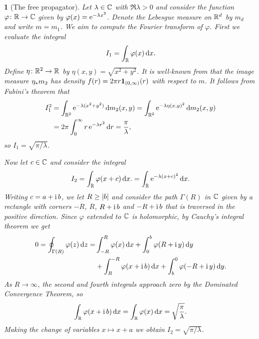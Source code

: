 \documentclass[article, a4paper, 11pt, oneside]{memoir}
\makeatletter
\let\phi\varphi
\numberwithin{equation}{chapter}
\theoremstyle{myexample}
\theoremstyle{myexample}
\theoremstyle{myexamplebreak}
\theoremstyle{myexamplebreak}
\newtheorem{examplebreak}[theorem]{\protect\@example}
\theoremstyle{nonumberplain}
\theoremstyle{MyNonumberplain}
\newcommand{\@example}{}
\renewcommand{\@example}{Example}%
\renewcommand{\@example}{Eksempel}%
\makeatother
\begin{document}
\begin{examplebreak}[The free propagator]
    Let $\lambda \in \mathbb{C}$ with $\Re \lambda > 0$ and consider the function $\phi \colon \setR \to \setC$ given by $\phi(x) = \e^{-\lambda x^2}$. Denote the Lebesgue measure on $\mathbb{R}^d$ by $m_d$ and write $m = m_1$. We aim to compute the Fourier transform of $\phi$. First we evaluate the integral
    \begin{equation*}
        I_1 = \int_\setR \phi(x) \dif x.
    \end{equation*}
    Define $\eta \colon \mathbb{R}^2 \to \mathbb{R}$ by $\eta(x,y) = \sqrt{x^2+y^2}$. It is well-known from \textcite[Opgave~11.4]{thorbjoernsen2014} that the image measure $\eta_* m_2$ has density $f(r) = 2\pi r \mathbf{1}_{(0,\infty)}(r)$ with respect to $m$. It follows from Fubini's theorem that
    \begin{align*}
        I_1^2
            &= \int_{\mathbb{R}^2} \operatorname{\mathrm{e}}^{- \lambda (x^2+y^2)} \mathop{}\!\mathrm{d} m_2(x,y)
             = \int_{\mathbb{R}^2} \operatorname{\mathrm{e}}^{- \lambda \eta(x,y)^2} \mathop{}\!\mathrm{d} m_2(x,y) \\
            &= 2\pi \int_0^\infty r \operatorname{\mathrm{e}}^{-\lambda r^2} \mathop{}\!\mathrm{d} r
             = \frac{\pi}{\lambda},
    \end{align*}
    so $I_1 = \sqrt{\pi/\lambda}$.
    
    Now let $c \in \mathbb{C}$ and consider the integral
    \begin{equation*}
        I_2
            = \int_\setR \phi(x + c) \dif x.
            = \int_\setR \e^{-\lambda (x+c)^2} \dif x.
    \end{equation*}
    Writing $c = a + \operatorname{i} b$, we let $R \geq \lvert b\rvert$ and consider the path $\Gamma(R)$ in $\mathbb{C}$ given by a rectangle with corners $-R$, $R$, $R + \operatorname{i} b$ and $-R + \operatorname{i} b$ that is traversed in the positive direction. Since $\phi$ extended to $\mathbb{C}$ is holomorphic, by Cauchy's integral theorem we get
    \begin{align*}
        0
            = \oint_{\Gamma(R)} \phi(z) \dif z
            =& \int_{-R}^R \phi(x) \dif x
              + \int_0^b \phi(R + \iu y) \dif y \\
              &{}+ \int_R^{-R} \phi(x + \iu b) \dif x
              + \int_b^0 \phi(-R + \iu y) \dif y.
    \end{align*}
    As $R \to \infty$, the second and fourth integrals approach zero by the Dominated Convergence Theorem, so
    \begin{equation*}
        \int_\setR \phi(x + \iu b) \dif x
            = \int_\setR \phi(x) \dif x
            = \sqrt{\frac{\pi}{\lambda}}.
    \end{equation*}
    Making the change of variables $x \mapsto x + a$ we obtain $I_2 = \sqrt{\pi/\lambda}$.
    

\end{examplebreak}
\end{document}

